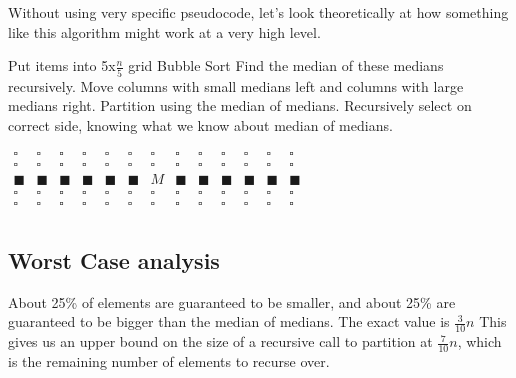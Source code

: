 \documentclass[english, 10pt]{article}
\begin{document}
Without using very specific pseudocode, let's look theoretically at how
something like this algorithm might work at a very high level.

\begin{algorithm}
    \DontPrintSemicolon%
    Put items into 5x$\frac{n}{5}$ grid\;
    Bubble Sort\; 
    Find the median of these medians recursively. 
    Move columns with small medians left and columns with large medians right. 
    Partition using the median of medians. 
    Recursively select on correct side, knowing what we know about median of medians. 
\end{algorithm}


$\begin{array}{cccccccccccccc}
    \square & \square & \square & \square & \square & \square & \square & \square & \square & \square & \square & \square & \square \\
    \square & \square & \square & \square & \square & \square & \square & \square & \square & \square & \square & \square & \square \\
    \blacksquare & \blacksquare & \blacksquare & \blacksquare & \blacksquare & \blacksquare & M &  \blacksquare &
    \blacksquare & \blacksquare & \blacksquare & \blacksquare & \blacksquare \\
    \square & \square & \square & \square & \square & \square & \square & \square & \square & \square & \square & \square & \square \\
    \square & \square & \square & \square & \square & \square & \square & \square & \square & \square & \square & \square & \square \\
\end{array}$

\subsection{Worst Case analysis}
    About 25\% of elements are guaranteed to be smaller, and about 25\% are
    guaranteed to be bigger than the median of medians.  The exact value is
    $\frac{3}{10}n$ This gives us an upper bound on the size of a recursive
    call to partition at $\frac{7}{10}n$, which is the remaining number of
    elements to recurse over.
\end{document}
